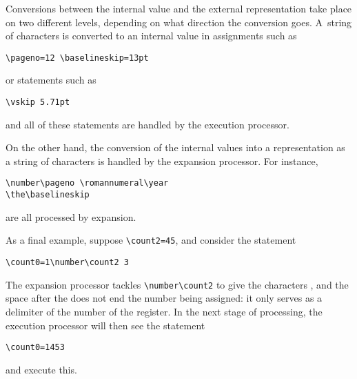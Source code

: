 \documentclass{book}
\begin{document}
Conversions between the internal value and the external
representation take place on two different levels,
depending on what direction the conversion goes.
A~string of characters is converted to an internal
value in assignments such as
\begin{verbatim}
\pageno=12 \baselineskip=13pt
\end{verbatim}
or statements such as
\begin{verbatim}
\vskip 5.71pt
\end{verbatim}
and all of these statements are handled by the execution
processor.

On the other hand, the conversion of the internal
values into a representation as a string of
characters is handled by the expansion processor.
For instance, \begin{verbatim}
\number\pageno \romannumeral\year
\the\baselineskip
\end{verbatim}
are all processed by expansion.

As a final example, suppose \verb>\count2=45>, and
consider the statement
\begin{verbatim}
\count0=1\number\count2 3
\end{verbatim}
The expansion processor tackles \verb>\number\count2>
to give the characters , and the space after
the  does not end the number being assigned:
it only serves as a delimiter
of the number of the  register.
In the next stage of processing, the execution processor
will then see the statement
\begin{verbatim}
\count0=1453
\end{verbatim}
and execute this.


\endofchapter
\end{document}

